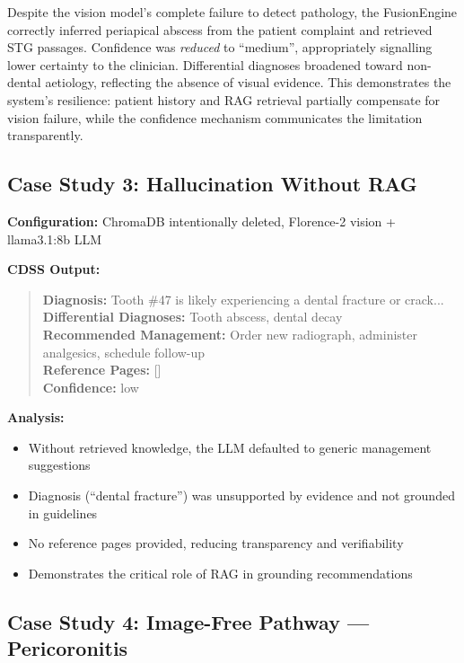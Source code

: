\documentclass[12pt,a4paper]{report}
\begin{document}
Despite the vision model's complete failure to detect pathology, the FusionEngine
correctly inferred periapical abscess from the patient complaint and retrieved
STG passages. Confidence was \emph{reduced} to ``medium'', appropriately
signalling lower certainty to the clinician. Differential diagnoses broadened
toward non-dental aetiology, reflecting the absence of visual evidence. This
demonstrates the system's resilience: patient history and RAG retrieval
partially compensate for vision failure, while the confidence mechanism
communicates the limitation transparently.


\subsection{Case Study 3: Hallucination Without RAG}

\textbf{Configuration:} ChromaDB intentionally deleted, Florence-2 vision + llama3.1:8b LLM

\textbf{CDSS Output:}
\begin{quote}
\textbf{Diagnosis:} Tooth \#47 is likely experiencing a dental fracture or crack... \\
\textbf{Differential Diagnoses:} Tooth abscess, dental decay \\
\textbf{Recommended Management:} Order new radiograph, administer analgesics, schedule follow-up \\
\textbf{Reference Pages:} []\\
\textbf{Confidence:} low
\end{quote}

\textbf{Analysis:}
\begin{itemize}
    \item Without retrieved knowledge, the LLM defaulted to generic management suggestions
    \item Diagnosis (``dental fracture'') was unsupported by evidence and not grounded in guidelines
    \item No reference pages provided, reducing transparency and verifiability
    \item Demonstrates the critical role of RAG in grounding recommendations
\end{itemize}


\subsection{Case Study 4: Image-Free Pathway --- Pericoronitis}
\label{subsec:case3}
\end{document}
